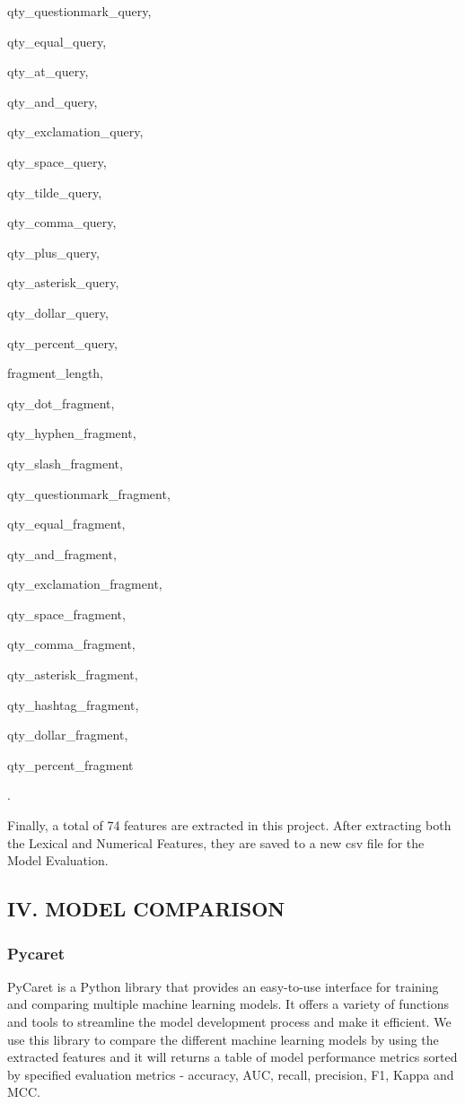 \documentclass[conference]{IEEEtran}
\begin{document}
\begin{enumerate*}[label=\textbullet]
qty\_questionmark\_query,\item qty\_equal\_query,\item qty\_at\_query,\item qty\_and\_query,\item qty\_exclamation\_query,\item qty\_space\_query,\item qty\_tilde\_query,\item qty\_comma\_query,\item qty\_plus\_query,\item qty\_asterisk\_query,\item qty\_dollar\_query,\item qty\_percent\_query,\item fragment\_length,\item qty\_dot\_fragment,\item qty\_hyphen\_fragment,\item qty\_slash\_fragment,\item qty\_questionmark\_fragment,\item qty\_equal\_fragment,\item qty\_and\_fragment,\item qty\_exclamation\_fragment,\item qty\_space\_fragment,\item qty\_comma\_fragment,\item qty\_asterisk\_fragment,\item qty\_hashtag\_fragment,\item qty\_dollar\_fragment,\item qty\_percent\_fragment
\end{enumerate*}.
\par Finally, a total of 74 features are extracted in this project. After extracting both the Lexical and Numerical Features, they are saved to a new csv file for the Model Evaluation.


\subsection*{IV. {\footnotesize MODEL COMPARISON}}
\subsubsection*{Pycaret}
\par PyCaret is a Python library that provides an easy-to-use interface for training and comparing multiple machine learning models. It offers a variety of functions and tools to streamline the model development process and make it efficient. We use this library to compare the different machine learning models by using the extracted features and it will returns a table of model performance metrics sorted by  specified evaluation metrics - accuracy, AUC, recall, precision, F1, Kappa and MCC.
\end{document}
